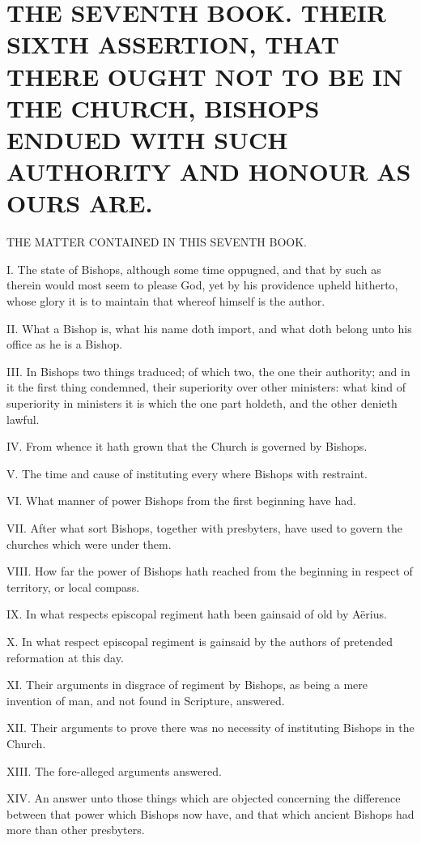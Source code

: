 \chapter*[The Seventh Book]{THE SEVENTH BOOK. 
THEIR SIXTH ASSERTION, THAT THERE OUGHT NOT TO BE IN THE CHURCH, BISHOPS ENDUED WITH SUCH AUTHORITY AND HONOUR AS OURS ARE.}
\label{chap:book7}

THE MATTER CONTAINED IN THIS SEVENTH BOOK.

I. The state of Bishops, although some time oppugned, and that by such as therein would most seem to please God, yet by his providence upheld hitherto, whose glory it is to maintain that whereof himself is the author.

II. What a Bishop is, what his name doth import, and what doth belong unto his office as he is a Bishop.

III. In Bishops two things traduced; of which two, the one their authority; and in it the first thing condemned, their superiority over other ministers: what kind of superiority in ministers it is which the one part holdeth, and the other denieth lawful.

IV. From whence it hath grown that the Church is governed by Bishops.

V. The time and cause of instituting every where Bishops with restraint.

VI. What manner of power Bishops from the first beginning have had.

VII. After what sort Bishops, together with presbyters, have used to govern the churches which were under them.

VIII. How far the power of Bishops hath reached from the beginning in respect of territory, or local compass.

IX. In what respects episcopal regiment hath been gainsaid of old by Aërius.

X. In what respect episcopal regiment is gainsaid by the authors of pretended reformation at this day.

XI. Their arguments in disgrace of regiment by Bishops, as being a mere invention of man, and not found in Scripture, answered.

XII. Their arguments to prove there was no necessity of instituting Bishops in the Church.

XIII. The fore-alleged arguments answered.

XIV. An answer unto those things which are objected concerning the difference between that power which Bishops now have, and that which ancient Bishops had more than other presbyters.

